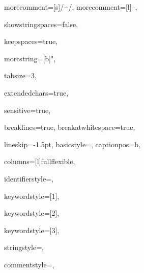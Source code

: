 {%
morecomment=[s]{/-}{-/},
morecomment=[l]{--},

showstringspaces=false,

keepspaces=true,

morestring=[b]{"},

tabsize=3,

extendedchars=true,

sensitive=true,

breaklines=true,
breakatwhitespace=true,

lineskip={-1.5pt},
basicstyle={\ttfamily},
captionpos=b,

columns=[l]fullflexible,


identifierstyle={\ttfamily\color{black}},

keywordstyle=[1]{\ttfamily\color{keywordcolor}},

keywordstyle=[2]{\ttfamily\color{sortcolor}},

keywordstyle=[3]{\ttfamily\color{errorcolor}},



stringstyle={\ttfamily\color{stringcolor}},

commentstyle={\ttfamily\itshape\color{commentcolor}},

}